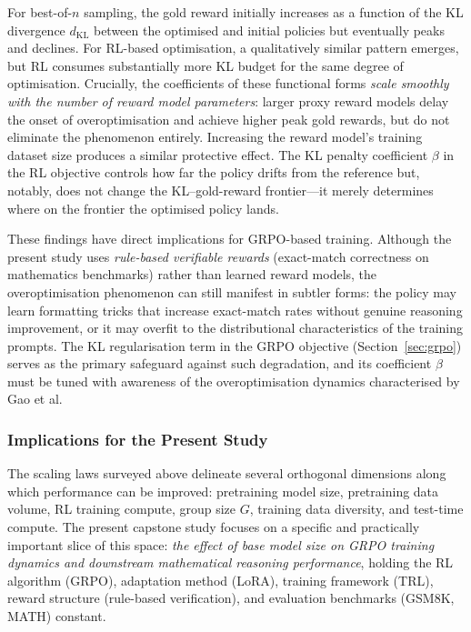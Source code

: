 For best-of-$n$ sampling, the gold reward initially increases as a function of
the KL divergence $d_{\mathrm{KL}}$ between the optimised and initial policies
but eventually peaks and declines.  For RL-based optimisation, a qualitatively
similar pattern emerges, but RL consumes substantially more KL budget for the
same degree of optimisation.  Crucially, the coefficients of these functional
forms \emph{scale smoothly with the number of reward model parameters}: larger
proxy reward models delay the onset of overoptimisation and achieve higher peak
gold rewards, but do not eliminate the phenomenon entirely.  Increasing the
reward model's training dataset size produces a similar protective effect.
The KL penalty coefficient $\beta$ in the RL objective controls how far the
policy drifts from the reference but, notably, does not change the
KL--gold-reward frontier---it merely determines where on the frontier the
optimised policy lands.

These findings have direct implications for GRPO-based training.  Although the
present study uses \emph{rule-based verifiable rewards} (exact-match correctness
on mathematics benchmarks) rather than learned reward models, the
overoptimisation phenomenon can still manifest in subtler forms: the policy may
learn formatting tricks that increase exact-match rates without genuine
reasoning improvement, or it may overfit to the distributional characteristics
of the training prompts.  The KL regularisation term in the GRPO objective
(Section~\ref{sec:grpo}) serves as the primary safeguard against such
degradation, and its coefficient $\beta$ must be tuned with awareness of the
overoptimisation dynamics characterised by Gao et al.

\subsubsection{Implications for the Present Study}

The scaling laws surveyed above delineate several orthogonal dimensions along
which performance can be improved: pretraining model size, pretraining data
volume, RL training compute, group size $G$, training data diversity, and
test-time compute.  The present capstone study focuses on a specific and
practically important slice of this space: \emph{the effect of base model size
on GRPO training dynamics and downstream mathematical reasoning performance},
holding the RL algorithm (GRPO), adaptation method (LoRA), training framework
(TRL), reward structure (rule-based verification), and evaluation benchmarks
(GSM8K, MATH) constant.

